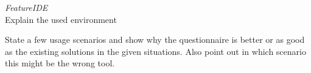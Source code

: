 \textit{FeatureIDE}\\
Explain the used environment

State a few usage scenarios and show why the questionnaire is better or as good as the existing solutions in the given situations. Also point out in which scenario this might be the wrong tool.


%


